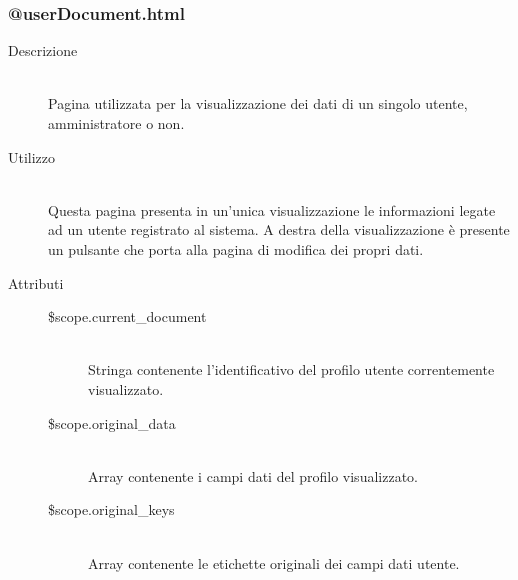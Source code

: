\subsubsection{@userDocument.html}
\begin{description}
	\item[Descrizione] \hfill \\
	Pagina utilizzata per la visualizzazione dei dati di un singolo utente, amministratore o non.
	\item[Utilizzo] \hfill \\
	Questa pagina presenta in un'unica visualizzazione le informazioni legate ad un utente registrato al sistema. A destra della visualizzazione è presente un pulsante che porta alla pagina di modifica dei propri dati.
	\item[Attributi] \hfill
 	\begin{description}
 		\item[\$scope.current\_document] \hfill \\
		Stringa contenente l'identificativo del profilo utente correntemente visualizzato.
		\item[\$scope.original\_data] \hfill \\
		Array contenente i campi dati del profilo visualizzato.
		\item[\$scope.original\_keys] \hfill \\
		Array contenente le etichette originali dei campi dati utente.
 	\end{description}
\end{description}

